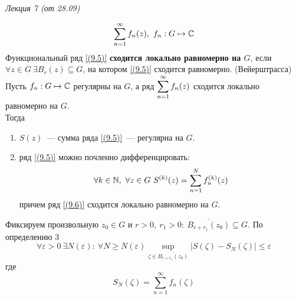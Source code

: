 \begin{flushright}
    \textit{Лекция 7 (от 28.09)}
\end{flushright}
\begin{equation}\label{(9.5)}
    \sum_{n=1}^{\infty}f_n(z), \ f_n: G \mapsto \mathbb{C}
\end{equation}
\Def
Функциональный ряд \eqref{(9.5)} \textbf{сходится локально равномерно на $G$},
если $\forall z \in G \ \exists B_r(z) \subseteq G$, на котором \eqref{(9.5)}
сходится равномерно.
\theorem (Вейерштрасса)
Пусть $f_n: G \mapsto \mathbb{C}$ регулярны на $G$, а ряд $\displaystyle
\sum_{n=1}^{\infty}f_n(z)$ сходится локально равномерно на $G$.
\\
Тогда
\begin{enumerate}
    \item $S(z)$~--- сумма ряда \eqref{(9.5)}~--- регулярна на $G$.
    \item ряд \eqref{(9.5)} можно почленно дифференцировать:
    \begin{equation}\label{(9.6)}
        \forall k \in \mathbb{N}, \ \forall z \in G \ S^{(k)}(z) = \sum_{n=1}^{N}f^{(k)}_n(z)
    \end{equation}
    причем ряд \eqref{(9.6)} сходится локально равномерно на $G$.
\end{enumerate}
\pr
Фиксируем произвольную $z_0 \in G$ и $r>0, \ r_1>0: \ \overline{B_{r+r_1}(z_0)}
\subseteq G$. По определению $3$
\begin{equation}\label{(9.7)}
    \forall \varepsilon > 0 \ \exists N(\varepsilon): \ \forall N \geq N(\varepsilon) \sup_{\zeta \in \overline{B_{r+r_1}(z_0)}}\left| S(\zeta) - S_N(\zeta) \right| \leq \varepsilon
\end{equation}
где
\begin{equation}\label{(9.8)}
    S_N(\zeta) = \sum_{n=1}^{\infty}f_n(\zeta)
\end{equation}
